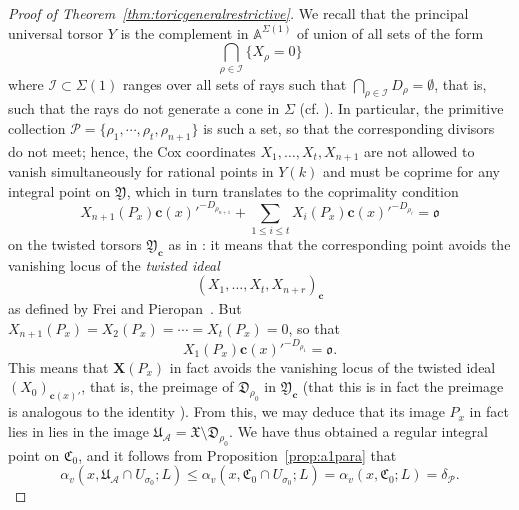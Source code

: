 \documentclass[a4paper, twoside, 11pt]{amsart}
\theoremstyle{definition}
\newcommand{\cA}{\mathcal{A}}
\newcommand{\cP}{\mathcal{P}}
\newcommand{\cI}{\mathcal{I}}
\newcommand{\bc}{\boldsymbol{c}}
\newcommand{\bX}{{\boldsymbol{X}}}
\newcommand{\mC}{\mathfrak{C}}
\newcommand{\mD}{\mathfrak{D}}
\newcommand{\mU}{\mathfrak{U}}
\newcommand{\mX}{\mathfrak{X}}
\newcommand{\mY}{\mathfrak{Y}}
\newcommand{\fo}{\mathfrak{o}}
\newcommand{\dA}{\mathbb{A}}
\begin{document}
\begin{proof}[Proof of Theorem~\ref{thm:toricgeneralrestrictive}]
We recall that the principal universal torsor $Y$ is the complement in $\dA^{\Sigma(1)}$ of union of all sets of the form
\begin{equation*}
	\bigcap_{\rho\in\cI}\{X_{\rho}=0\}
\end{equation*}
where $\cI\subset\Sigma(1)$ ranges over all sets of rays such that
$\bigcap_{\rho\in\cI} D_{\rho}=\emptyset$, that is, such that the rays do not generate a cone in $\Sigma$ (cf. \cite[Eq.~(22)]{HuangANT}). In particular, the primitive collection
$\cP = \{\rho_1,\cdots,\rho_t,\rho_{n+1}\}$ is such a set, so that the corresponding divisors do not meet; hence, the Cox coordinates $X_1,\dots, X_t, X_{n+1}$ are not allowed to vanish simultaneously for rational points in $Y(k)$ and must be coprime for any integral point on $\mY$, which in turn translates to the coprimality condition 
\begin{equation*}
	X_{n+1}(P_x)\bc(x)'^{-D_{\rho_{n+1}}}+\sum_{1\leq i\leq t} X_i(P_x)\bc(x)'^{-D_{\rho_i}}=\fo
\end{equation*}
on the twisted torsors $\mY_{\bc}$ as in \cite[Thm.~2.7 (iii)]{FP}: it means that the corresponding point avoids the vanishing locus of the \emph{twisted ideal}
\begin{equation*}
	(X_1,\dots,X_t,X_{n+r})_{\bc}
\end{equation*}
as defined by Frei and Pieropan~\cite[Def.~2.4]{FP}.
But $X_{n+1}(P_x)=X_2(P_x)=\cdots=X_{t}(P_x)=0$, so that
	\begin{equation*}
		X_1(P_x)\bc(x)'^{-D_{\rho_1}}=\fo.
	\end{equation*}
	This means that $\bX(P_x)$ in fact avoids the vanishing locus of the twisted ideal $(X_0)_{\bc(x)'}$, that is, the preimage of $\mD_{\rho_0}$ in $\mY_{\bc}$ (that this is in fact the preimage is analogous to the identity \cite[Eq.~(2.13)]{MR4822120}).
	From this, we may deduce that its image $P_x$ in fact lies in lies in the image $\mU_{\cA} = \mX\setminus \mD_{\rho_0}$. 
	We have thus obtained a regular integral point on $\mC_0$, and it follows from Proposition~\ref{prop:a1para} that $$\alpha_v(x,\mU_{\cA}\cap U_{\sigma_0};L)\leq\alpha_v(x,\mC_0\cap U_{\sigma_0};L)=\alpha_v(x,\mC_0;L)=\delta_\cP.$$


\end{proof}
\end{document}
